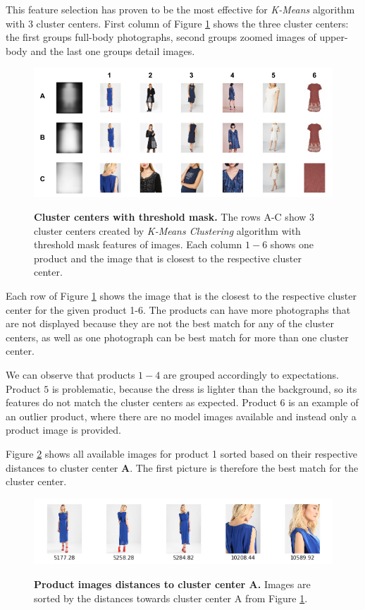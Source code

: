 \documentclass[12pt]{report}
\begin{document}
This feature selection has proven to be the most effective for \textit{K-Means} algorithm with 3 cluster centers. First column of Figure \ref{fig:cluster_outline} shows the three cluster centers: the first groups full-body photographs, second groups zoomed images of upper-body and the last one groups detail images. 

\begin{figure}[h]
\centering
{\includegraphics[width=\linewidth]{04_experiments/clustering/outlines_clusters}}
\caption{\label{fig:cluster_outline} \textbf{Cluster centers with threshold mask.} The rows A-C show 3 cluster centers created by \textit{K-Means Clustering} algorithm with threshold mask features of images. Each column $1-6$ shows one product and the image that is closest to the respective cluster center.}
\end{figure}

Each row of Figure \ref{fig:cluster_outline} shows the image that is the closest to the respective cluster center for the given product 1-6. The products can have more photographs that are not displayed because they are not the best match for any of the cluster centers, as well as  one photograph can be best match for more than one cluster center. 

We can observe that products $1-4$ are grouped accordingly to expectations. Product $5$ is problematic, because the dress is lighter than the background, so its features do not match the cluster centers as expected. Product $6$ is an example of an outlier product, where there are no model images available and instead only a product image is provided.

Figure \ref{fig:cluster_outline_distances} shows all available images for product 1 sorted based on their respective distances to cluster center \textbf{A}. The first picture is therefore the best match for the cluster center.

\begin{figure}[h]
\centering
{\includegraphics[width=\linewidth]{04_experiments/clustering/outlines_distances}}
\caption{\label{fig:cluster_outline_distances} \textbf{Product images distances to cluster center A.} Images are sorted by the distances towards cluster center A from Figure \ref{fig:cluster_outline}.}
\end{figure}
\end{document}
